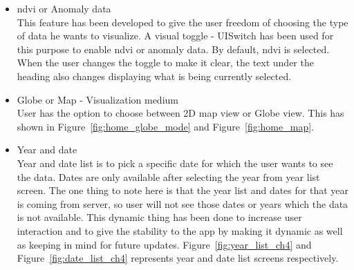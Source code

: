 \begin{itemize}
    \item \gls{ndvi} or Anomaly data \\
    This feature has been developed to give the user freedom of choosing the type of data he wants to visualize. A visual toggle - UISwitch has been used for this purpose to enable \gls{ndvi} or anomaly data. By default, \gls{ndvi} is selected. When the user changes the toggle to make it clear, the text under the heading also changes displaying what is being currently selected. 
  
    \item Globe or Map - Visualization medium \\
    User has the option to choose between 2D map view or Globe view.
    This has shown in Figure~\ref{fig:home_globe_mode} and Figure~\ref{fig:home_map}.

    \item Year and date \\
    Year and date list is to pick a specific date for which the user wants to see the data. Dates are only available after selecting the year from year list screen. The one thing to note here is that the year list and dates for that year is coming from server, so user will not see those dates or years which the data is not available.
    This dynamic thing has been done to increase user interaction and to give the stability to the app by making it dynamic as well as keeping in mind for future updates. Figure~\ref{fig:year_list_ch4} and Figure~\ref{fig:date_list_ch4} represents year and date list screens respectively.
   

\end{itemize}
